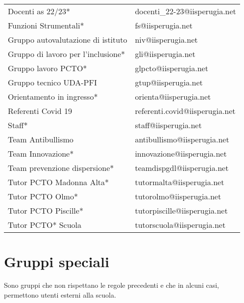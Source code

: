 \begin{center}
\begin{tabular}{ll}
Docenti as 22/23*&
docenti\_22-23@iisperugia.net\\
Funzioni Strumentali*&
fs@iisperugia.net\\
Gruppo autovalutazione di istituto&
niv@iisperugia.net\\
Gruppo di lavoro per l'inclusione*&
gli@iisperugia.net\\
Gruppo lavoro PCTO*&
glpcto@iisperugia.net\\
Gruppo tecnico UDA-PFI&
gtup@iisperugia.net\\
Orientamento in ingresso*&
orienta@iisperugia.net\\
Referenti Covid 19&
referenti.covid@iisperugia.net\\
Staff*&
staff@iisperugia.net\\
Team Antibullismo &
antibullismo@iisperugia.net\\
Team Innovazione*&
innovazione@iisperugia.net\\
Team prevenzione dispersione*&
teamdispgdl@iisperugia.net\\
Tutor PCTO Madonna Alta*&
tutormalta@iisperugia.net\\
Tutor PCTO Olmo*&
tutorolmo@iisperugia.net\\
Tutor PCTO Piscille* &
tutorpiscille@iisperugia.net\\
Tutor PCTO* Scuola&
tutorscuola@iisperugia.net\\
\midrule
\end{tabular}
\end{center}
\section{Gruppi speciali}
Sono gruppi che non rispettano le regole precedenti e che in alcuni casi, permettono utenti esterni alla scuola.
